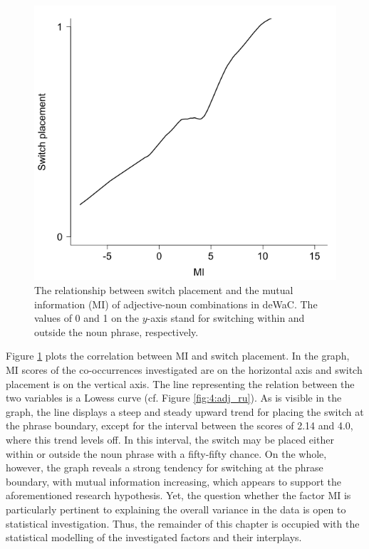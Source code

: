\begin{figure}
    \includegraphics[scale=0.5]{figures/4-MI_de.png}
	\caption{The relationship between switch placement and the mutual information (MI) of adjective-noun combinations in deWaC. The values of 0 and 1 on the $y$-axis stand for switching within and outside the noun phrase, respectively.}
	\label{fig:4:MI_de}
\end{figure}

Figure \ref{fig:4:MI_de} plots the correlation between MI and switch placement. In the graph, MI scores of the co-occurrences investigated are on the horizontal axis and switch placement is on the vertical axis. The line representing the relation between the two variables is a Lowess curve (cf. Figure \ref{fig:4:adj_ru}). As is visible in the graph, the line displays a steep and steady upward trend for placing the switch at the phrase boundary, except for the interval between the scores of 2.14 and 4.0, where this trend levels off. In this interval, the switch may be placed either within or outside the noun phrase with a fifty-fifty chance. On the whole, however, the graph reveals a strong tendency for switching at the phrase boundary, with mutual information increasing, which appears to support the aforementioned research hypothesis. Yet, the question whether the factor MI is particularly pertinent to explaining the overall variance in the data is open to statistical investigation. Thus, the remainder of this chapter is occupied with the statistical modelling of the investigated factors and their interplays.

